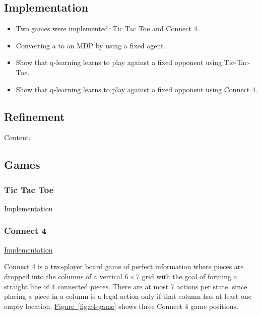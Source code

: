\documentclass{article}
\begin{document}
\subsection{Implementation}

\begin{itemize}

    \item Two games were implemented: Tic Tac Toe and Connect 4.
    \item Converting a to an MDP by using a fixed agent.
    \item Show that q-learning learns to play against a fixed opponent using Tic-Tac-Toe.
    \item Show that q-learning learns to play against a fixed opponent using Connect 4.

\end{itemize}

\subsection{Refinement}

Content.

\subsection{Games}

\subsubsection{Tic Tac Toe}

\noindent
\href{https://github.com/davidrobles/mlnd-capstone-code/blob/master/capstone/game/tictactoe.py}
     {Implementation}
\break

\subsubsection{Connect 4}

\noindent
\href{https://github.com/davidrobles/mlnd-capstone-code/blob/master/capstone/game/connect4.py}
     {Implementation}
\break

Connect 4 is a two-player board game of perfect information where pieces are dropped into the
columns of a vertical $6 \times 7$ grid with the goal of forming a straight line of 4 connected
pieces. There are at most 7 actions per state, since placing a piece in a column is a legal action
only if that column has at least one empty location. \hyperref[fig:c4-game]{Figure~\ref*{fig:c4-game}}
shows three Connect 4 game positions. 
\end{document}
